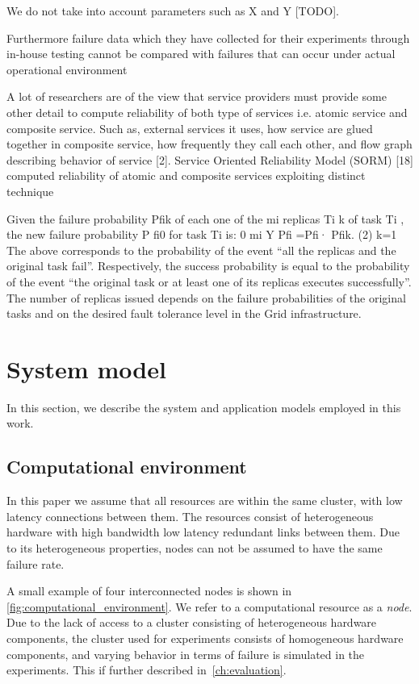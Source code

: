 \documentclass{cslthse-msc}
\begin{document}
We do not take into account parameters such as X and Y [TODO].

Furthermore failure data which they have collected for their experiments through in-house testing cannot be compared with failures that can occur under actual operational environment \cite{surveyReliabilityDistr}

A lot of researchers are of the view that service providers must provide some other detail to compute reliability of both type of services i.e. atomic service and composite service. Such as, external services it uses, how service are glued together in composite service, how frequently they call each other, and flow graph describing behavior of service [2]. Service Oriented Reliability Model (SORM) [18] computed reliability of atomic and composite services exploiting distinct technique \cite{surveyReliabilityDistr}

Given the failure probability Pfik of each one of the mi replicas Ti k of task Ti , the new failure probability P fi0 for task Ti is:
0 mi Y
Pfi =Pfi· Pfik. (2) k=1
The above corresponds to the probability of the event “all the replicas and the original task fail”. Respectively, the success probability is equal to the probability of the event “the original task or at least one of its replicas executes successfully”. The number of replicas issued depends on the failure probabilities of the original tasks and on the desired fault tolerance level in the Grid infrastructure. \cite{effTaskReplMobGrid}
\fi

\section{System model} \label{sec:design_system_model}
In this section, we describe the system and application models employed in this work.

\subsection{Computational environment} \label{subsec:design_comp_env}
In this paper we assume that all resources are within the same cluster, with low latency connections between them. The resources consist of heterogeneous hardware with high bandwidth low latency redundant links between them. Due to its heterogeneous properties, nodes can not be assumed to have the same failure rate.

A small example of four interconnected nodes is shown in \cref{fig:computational_environment}. We refer to a computational resource as a \emph{node}. Due to the lack of access to a cluster consisting of heterogeneous hardware components, the cluster used for experiments consists of homogeneous hardware components, and varying behavior in terms of failure is simulated in the experiments. This if further described in~\cref{ch:evaluation}.
\end{document}
